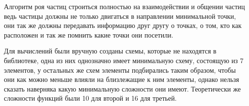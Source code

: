 \documentclass[14pt]{extarticle} %
\begin{document}
Алгоритм роя частиц строиться полностью на взаимодействии и общении частиц ведь частицы должны не только двигаться в направлении минимальной точки, они так же должны передавать информацию друг другу о точках, о том, кто как расположен и так же помнить какие точки они посетили.




























\nocite{diff}

\nocite{diff1}

\nocite{inproceedings}





Для вычислений были вручную созданы схемы, которые не находятся в библиотеке, одна из них однозначно имеет минимальную схему, состоящую из 7 элементов, у остальных же схем элементы подбирались таким образом, чтобы они как можно меньше влияли на близлежащие к ним элементы, однако нельзя сказать наверняка какую минимальную сложности они имеют. Теоретически же сложности функций были 10 для второй и 16 для третьей. 


\end{document}
